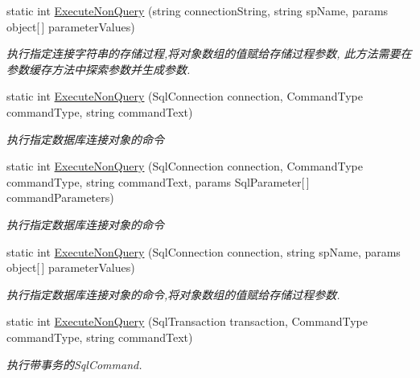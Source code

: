 \begin{DoxyCompactItemize}
static int \hyperlink{class_x_c_l_net_tools_1_1_data_base_1_1_m_s_s_q_l_1_1_sql_helper_a81e71567fe527b8c2a53c0d51c4237bf}{Execute\-Non\-Query} (string connection\-String, string sp\-Name, params object\mbox{[}$\,$\mbox{]} parameter\-Values)
\begin{DoxyCompactList}\small\item\em 执行指定连接字符串的存储过程,将对象数组的值赋给存储过程参数, 此方法需要在参数缓存方法中探索参数并生成参数. \end{DoxyCompactList}\item 
static int \hyperlink{class_x_c_l_net_tools_1_1_data_base_1_1_m_s_s_q_l_1_1_sql_helper_a472dab96a9cbd203dcd6b405c1117d60}{Execute\-Non\-Query} (Sql\-Connection connection, Command\-Type command\-Type, string command\-Text)
\begin{DoxyCompactList}\small\item\em 执行指定数据库连接对象的命令 \end{DoxyCompactList}\item 
static int \hyperlink{class_x_c_l_net_tools_1_1_data_base_1_1_m_s_s_q_l_1_1_sql_helper_a7db7b9f1a9ef47844c9e3f25f41ca57b}{Execute\-Non\-Query} (Sql\-Connection connection, Command\-Type command\-Type, string command\-Text, params Sql\-Parameter\mbox{[}$\,$\mbox{]} command\-Parameters)
\begin{DoxyCompactList}\small\item\em 执行指定数据库连接对象的命令 \end{DoxyCompactList}\item 
static int \hyperlink{class_x_c_l_net_tools_1_1_data_base_1_1_m_s_s_q_l_1_1_sql_helper_a61929b6c26c4fe2d70271ba4ace7125b}{Execute\-Non\-Query} (Sql\-Connection connection, string sp\-Name, params object\mbox{[}$\,$\mbox{]} parameter\-Values)
\begin{DoxyCompactList}\small\item\em 执行指定数据库连接对象的命令,将对象数组的值赋给存储过程参数. \end{DoxyCompactList}\item 
static int \hyperlink{class_x_c_l_net_tools_1_1_data_base_1_1_m_s_s_q_l_1_1_sql_helper_a480185da9390a493ada4ec7bab8829db}{Execute\-Non\-Query} (Sql\-Transaction transaction, Command\-Type command\-Type, string command\-Text)
\begin{DoxyCompactList}\small\item\em 执行带事务的\-Sql\-Command. \end{DoxyCompactList}\item 

\end{DoxyCompactItemize}
